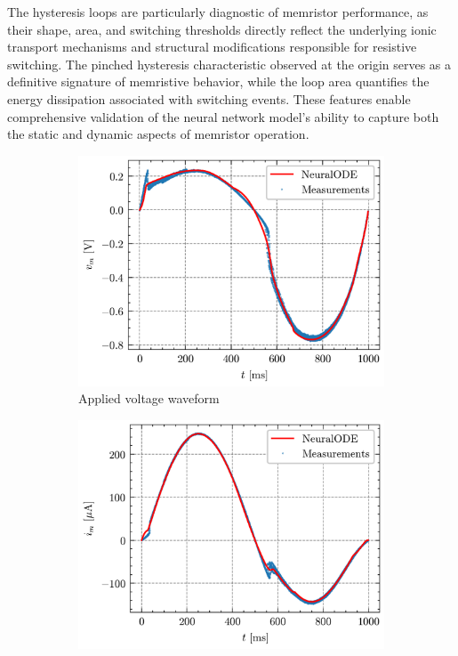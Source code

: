 \documentclass[11pt, oneside]{article}
\begin{document}
The hysteresis loops are particularly diagnostic of memristor performance, as their shape, area, and switching thresholds directly reflect the underlying ionic transport mechanisms and structural modifications responsible for resistive switching. The pinched hysteresis characteristic observed at the origin serves as a definitive signature of memristive behavior, while the loop area quantifies the energy dissipation associated with switching events. These features enable comprehensive validation of the neural network model's ability to capture both the static and dynamic aspects of memristor operation.

\newcommand{\subwidth}{0.32\linewidth}
\begin{figure}[H]
    \centering
    \begin{subfigure}[b]{\subwidth}
        \includegraphics[width=\linewidth]{sample_results/v_m.png}
        \caption{Applied voltage waveform}
    \end{subfigure}
    \begin{subfigure}[b]{\subwidth}
        \includegraphics[width=\linewidth]{sample_results/i_m.png}

\end{subfigure}
\end{figure}
\end{document}
